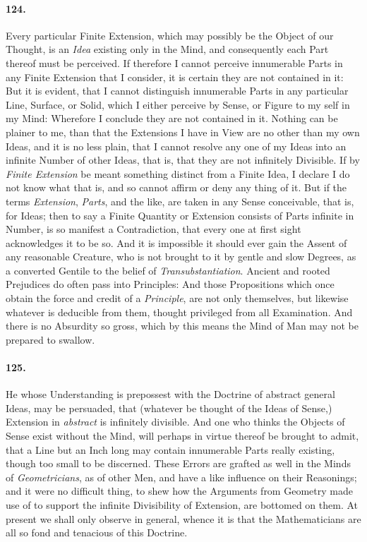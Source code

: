 \documentclass[]{article}
\newenvironment{sectionbody}{\begin{multicols}{2}}{\end{multicols}}
\begin{document}
\begin{sectionbody}
\paragraph{124.} Every particular Finite Extension, which may possibly be the
Object of our Thought, is an \emph{Idea} existing only in the
Mind, and consequently each Part thereof must be perceived.  If
therefore I cannot perceive innumerable Parts in any Finite
Extension that I consider, it is certain they are not contained
in it: But it is evident, that I cannot distinguish innumerable
Parts in any particular Line, Surface, or Solid, which I either
perceive by Sense, or Figure to my self in my Mind: Wherefore I
conclude they are not contained in it.  Nothing can be plainer to
me, than that the Extensions I have in View are no other than my
own Ideas, and it is no less plain, that I cannot resolve any one
of my Ideas into an infinite Number of other Ideas, that is, that
they are not infinitely Divisible.  If by \emph{Finite
Extension} be meant something distinct from a Finite Idea, I
declare I do not know what that is, and so cannot affirm or deny
any thing of it.  But if the terms \emph{Extension},
\emph{Parts}, and the like, are taken in any Sense conceivable,
that is, for Ideas; then to say a Finite Quantity or Extension
consists of Parts infinite in Number, is so manifest a
Contradiction, that every one at first sight acknowledges it to
be so.  And it is impossible it should ever gain the Assent of
any reasonable Creature, who is not brought to it by gentle and
slow Degrees, as a converted Gentile to the belief of
\emph{Transubstantiation}.  Ancient and rooted Prejudices do
often pass into Principles: And those Propositions which once
obtain the force and credit of a \emph{Principle}, are not only
themselves, but likewise whatever is deducible from them, thought
privileged from all Examination.  And there is no Absurdity so
gross, which by this means the Mind of Man may not be prepared to
swallow.



\paragraph{125.} He whose Understanding is prepossest with the Doctrine of
abstract general Ideas, may be persuaded, that (whatever be
thought of the Ideas of Sense,) Extension in \emph{abstract} is
infinitely divisible.  And one who thinks the Objects of Sense
exist without the Mind, will perhaps in virtue thereof be brought
to admit, that a Line but an Inch long may contain innumerable
Parts really existing, though too small to be discerned.  These
Errors are grafted as well in the Minds of
\emph{Geometricians}, as of other Men, and have a like influence
on their Reasonings; and it were no difficult thing, to shew how
the Arguments from Geometry made use of to support the infinite
Divisibility of Extension, are bottomed on them.  At present we
shall only observe in general, whence it is that the
Mathematicians are all so fond and tenacious of this Doctrine.




\end{sectionbody}
\end{document}
